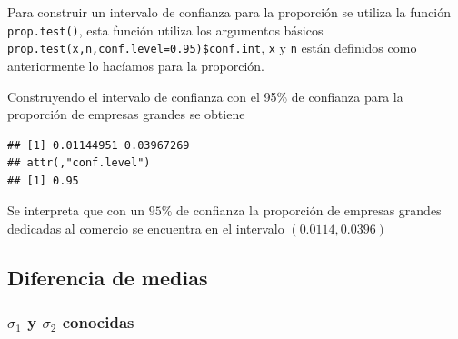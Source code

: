 \documentclass[
]{krantz}
\makeatletter
\newenvironment{Shaded}{\begin{snugshade}}{\end{snugshade}}
\newcommand{\DataTypeTok}[1]{\textcolor[rgb]{0.27,0.27,0.27}{#1}}
\newcommand{\KeywordTok}[1]{\textcolor[rgb]{0.27,0.27,0.27}{\textbf{#1}}}
\newcommand{\NormalTok}[1]{#1}
\newcommand{\OperatorTok}[1]{\textcolor[rgb]{0.43,0.43,0.43}{\textbf{#1}}}
\newcommand{\OtherTok}[1]{\textcolor[rgb]{0.37,0.37,0.37}{#1}}
\newcommand{\StringTok}[1]{\textcolor[rgb]{0.5,0.5,0.5}{#1}}
\newenvironment{kframe}{%
\medskip{}
\setlength{\fboxsep}{.8em}
 \def\at@end@of@kframe{}%
 \ifinner\ifhmode%
  \def\at@end@of@kframe{\end{minipage}}%
  \begin{minipage}{\columnwidth}%
 \fi\fi%
 \def\FrameCommand##1{\hskip\@totalleftmargin \hskip-\fboxsep
 \colorbox{shadecolor}{##1}\hskip-\fboxsep
     \hskip-\linewidth \hskip-\@totalleftmargin \hskip\columnwidth}%
 \MakeFramed {\advance\hsize-\width
   \@totalleftmargin\z@ \linewidth\hsize
   \@setminipage}}%
 {\par\unskip\endMakeFramed%
 \at@end@of@kframe}
\renewenvironment{Shaded}{\begin{kframe}}{\end{kframe}}
\makeatother
\begin{document}
\begin{Shaded}
\end{Shaded}

Para construir un intervalo de confianza para la proporción se utiliza la función \texttt{prop.test()}, esta función utiliza los argumentos básicos \texttt{prop.test(x,n,conf.level=0.95)\$conf.int}, \texttt{x} y \texttt{n} están definidos como anteriormente lo hacíamos para la proporción.

Construyendo el intervalo de confianza con el 95\% de confianza para la proporción de empresas grandes se obtiene

\begin{Shaded}
\end{Shaded}

\begin{verbatim}
## [1] 0.01144951 0.03967269
## attr(,"conf.level")
## [1] 0.95
\end{verbatim}

Se interpreta que con un \(95\%\) de confianza la proporción de empresas grandes dedicadas al comercio se encuentra en el intervalo \(\left(0.0114, 0.0396 \right)\)

\hypertarget{diferencia-de-medias}{%
\subsection{Diferencia de medias}\label{diferencia-de-medias}}

\hypertarget{sigma_1-y-sigma_2-conocidas}{%
\subsubsection{\texorpdfstring{\(\sigma_1\) y \(\sigma_2\) conocidas}{\textbackslash{}sigma\_1 y \textbackslash{}sigma\_2 conocidas}}\label{sigma_1-y-sigma_2-conocidas}}
\end{document}
